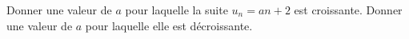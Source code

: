 
\begin{exercice}\label{exosmath-0160}

    Donner une valeur de \( a\) pour laquelle la suite \( u_n=an+2\) est croissante. Donner une valeur de \( a\) pour laquelle elle est décroissante.

\end{exercice}

